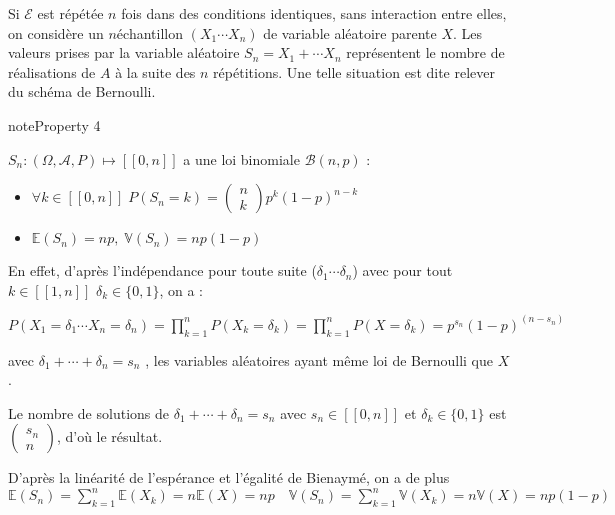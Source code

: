 \documentclass[letterpaper,10pt,french]{sphinxmanual}
\begin{document}
\sphinxAtStartPar
Si \(\mathcal E\) est répétée \(n\) fois dans des conditions identiques, sans interaction entre elles, on considère un \(n\)\sphinxhyphen{}échantillon \((X_1\cdots X_n)\) de variable aléatoire parente \(X\). Les valeurs prises par la variable aléatoire \(S_n=X_1+\cdots X_n\) représentent le nombre de réalisations de \(A\) à la suite des \(n\) répétitions. Une telle situation est dite relever du schéma de Bernoulli.
\label{elemstats:property-1}
\begin{sphinxadmonition}{note}{Property 4}



\sphinxAtStartPar
\(S_n:(\Omega,\mathcal A,P)\mapsto [\![0,n]\!]\) a une loi binomiale \(\mathcal{B}(n,p)\) :
\begin{itemize}
\item {} 
\sphinxAtStartPar
\(\forall k\in[\![0,n]\!]\; P(S_n=k)=\begin{pmatrix}n\\k\end{pmatrix} p^k (1-p)^{n-k}\)

\item {} 
\sphinxAtStartPar
\(\mathbb{E}(S_n)=np,\; \mathbb{V}(S_n)=np(1-p)\)

\end{itemize}
\end{sphinxadmonition}

\sphinxAtStartPar
En effet, d’après l’indépendance pour toute suite (\(\delta_1\cdots \delta_n\)) avec pour tout \(k\in[\![1,n]\!]\) \(\delta_k\in\{0,1\}\), on a :

\sphinxAtStartPar
\(P(X_1=\delta_1\cdots X_n=\delta_n) = \displaystyle\prod_{k=1}^n P(X_k=\delta_k) = \displaystyle\prod_{k=1}^n P(X=\delta_k)=p^{s_n}(1-p)^{(n-s_n)}\)

\sphinxAtStartPar
avec \(\delta_1+\cdots+ \delta_n=s_n\) , les variables aléatoires ayant même loi de Bernoulli que \(X\).

\sphinxAtStartPar
Le nombre de solutions de \(\delta_1+\cdots+ \delta_n=s_n\) avec \(s_n\in[\![0,n]\!]\) et \(\delta_k\in\{0,1\}\) est \(\begin{pmatrix}s_n\\n\end{pmatrix}\), d’où le résultat.

\sphinxAtStartPar
D’après la linéarité de l’espérance et l’égalité de Bienaymé, on a de plus
\(\mathbb{E}(S_n) = \displaystyle\sum_{k=1}^n \mathbb{E}(X_k)=n\mathbb{E}(X)=np\quad \mathbb{V}(S_n)=\displaystyle\sum_{k=1}^n \mathbb{V}(X_k)=n\mathbb{V}(X)=np(1-p)\)
\end{document}
